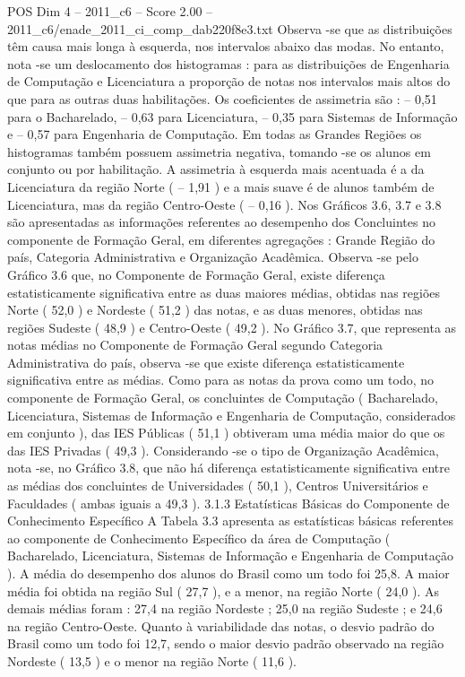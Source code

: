 \begin{textsample}{POS Dim 4 – 2011\_c6 – Score 2.00 – 2011\_c6/enade\_2011\_ci\_comp\_dab220f8e3.txt}
Observa -se que as distribuições têm causa mais longa à esquerda, nos intervalos abaixo das modas.
No entanto, nota -se um deslocamento dos histogramas : para as distribuições de Engenharia de Computação e Licenciatura a proporção de notas nos intervalos mais altos do que para as outras duas habilitações.
Os coeficientes de assimetria são : – 0,51 para o Bacharelado, – 0,63 para Licenciatura, – 0,35 para Sistemas de Informação e – 0,57 para Engenharia de Computação.
Em todas as Grandes Regiões os histogramas também possuem assimetria negativa, tomando -se os alunos em conjunto ou por habilitação.
A assimetria à esquerda mais acentuada é a da Licenciatura da região Norte ( – 1,91 ) e a mais suave é de alunos também de Licenciatura, mas da região Centro-Oeste ( – 0,16 ).
Nos Gráficos 3.6, 3.7 e 3.8 são apresentadas as informações referentes ao desempenho dos Concluintes no componente de Formação Geral, em diferentes agregações : Grande Região do país, Categoria Administrativa e Organização Acadêmica.
Observa -se pelo Gráfico 3.6 que, no Componente de Formação Geral, existe diferença estatisticamente significativa entre as duas maiores médias, obtidas nas regiões Norte ( 52,0 ) e Nordeste ( 51,2 ) das notas, e as duas menores, obtidas nas regiões Sudeste ( 48,9 ) e Centro-Oeste ( 49,2 ).
No Gráfico 3.7, que representa as notas médias no Componente de Formação Geral segundo Categoria Administrativa do país, observa -se que existe diferença estatisticamente significativa entre as médias.
Como para as notas da prova como um todo, no componente de Formação Geral, os concluintes de Computação ( Bacharelado, Licenciatura, Sistemas de Informação e Engenharia de Computação, considerados em conjunto ), das IES Públicas ( 51,1 ) obtiveram uma média maior do que os das IES Privadas ( 49,3 ).
Considerando -se o tipo de Organização Acadêmica, nota -se, no Gráfico 3.8, que não há diferença estatisticamente significativa entre as médias dos concluintes de Universidades ( 50,1 ), Centros Universitários e Faculdades ( ambas iguais a 49,3 ). 3.1.3 Estatísticas Básicas do Componente de Conhecimento Específico A Tabela 3.3 apresenta as estatísticas básicas referentes ao componente de Conhecimento Específico da área de Computação ( Bacharelado, Licenciatura, Sistemas de Informação e Engenharia de Computação ).
A média do desempenho dos alunos do Brasil como um todo foi 25,8.
A maior média foi obtida na região Sul ( 27,7 ), e a menor, na região Norte ( 24,0 ).
As demais médias foram : 27,4 na região Nordeste ; 25,0 na região Sudeste ; e 24,6 na região Centro-Oeste.
Quanto à variabilidade das notas, o desvio padrão do Brasil como um todo foi 12,7, sendo o maior desvio padrão observado na região Nordeste ( 13,5 ) e o menor na região Norte ( 11,6 ).

\end{textsample}
